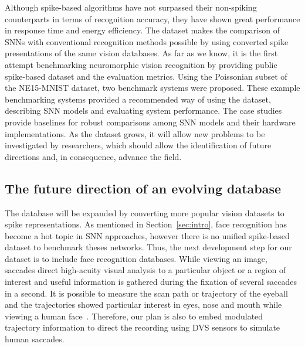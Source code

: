 \documentclass{frontiersENG} %
\begin{document}
Although spike-based algorithms have not surpassed their non-spiking counterparts in terms of recognition accuracy, they have shown great performance in response time and energy efficiency.
The dataset makes the comparison of SNNs with conventional recognition methods possible by using converted spike presentations of the same vision databases.
As far as we know, it is the first attempt benchmarking neuromorphic vision recognition by providing public spike-based dataset and the evaluation metrics.
Using the Poissonian subset of the NE15-MNIST dataset, two benchmark systems were proposed. 
These example benchmarking systems provided a recommended way of using the dataset, describing SNN models and evaluating system performance.
The case studies provide baselines for robust comparisons among SNN models and their hardware implementations.
As the dataset grows, it will allow new problems to be investigated by researchers, which should allow the identification of future directions and, in consequence, advance the field.
\subsection{The future direction of an evolving database}
The database will be expanded by converting more popular vision datasets to spike representations.
As mentioned in Section~\ref{sec:intro}, face recognition has become a hot topic in SNN approaches, however there is no unified spike-based dataset to benchmark theses networks.
Thus, the next development step for our dataset is to include face recognition databases.
While viewing an image,  saccades direct high-acuity visual analysis to a particular object or a region of interest and useful information is gathered during the fixation of several saccades in a second.
It is possible to measure the scan path or trajectory of the eyeball and the trajectories showed particular interest in eyes, nose and mouth while viewing a human face~\citep{yarbus1967eye}.
Therefore, our plan is also to embed modulated trajectory information to direct the recording using DVS sensors to simulate human saccades.
\end{document}
